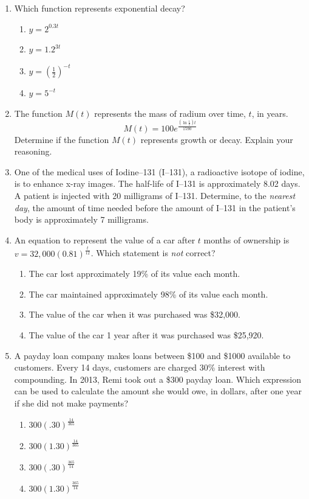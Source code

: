 \documentclass[12pt, oneside]{article}
\begin{document}
\begin{enumerate}
\item Which function represents exponential decay?
\begin{enumerate}
    \item $y=2^{0.3t}$
    \item $y=1.2^{3t}$
    \item $\displaystyle y=\left( \frac{1}{2}\right) ^{-t}$
    \item $y=5^{-t}$
\end{enumerate} %

\item The function $M(t)$ represents the mass of radium over time, $t$, in years.
\[M(t)=100e^{\frac{\left(\ln{\frac{1}{2}}\right)t}{1590}}
\]
Determine if the function $M(t)$ represents growth or decay. Explain your reasoning. %

\item One of the medical uses of Iodine–131 (I–131), a radioactive isotope of iodine, is to enhance x-ray images. The half-life of I–131 is approximately 8.02 days. A patient is injected with 20 milligrams of I–131. Determine, to the \emph{nearest day}, the amount of time needed before the amount of I–131 in the patient’s body is approximately 7 milligrams. %

\item An equation to represent the value of a car after $t$ months of ownership is $\displaystyle v=32,000(0.81)^{\frac{t}{12}}$. Which statement is \emph{not} correct?
\begin{enumerate}
    \item The car lost approximately 19\% of its value each month.
    \item The car maintained approximately 98\% of its value each month.
    \item The value of the car when it was purchased was \$32,000.
    \item The value of the car 1 year after it was purchased was \$25,920.
\end{enumerate} %

\item A payday loan company makes loans between \$100 and \$1000 available to customers. Every 14 days, customers are charged 30\% interest with compounding. In 2013, Remi took out a \$300 payday loan. Which expression can be used to calculate the amount she would owe, in dollars, after one year if she did not make payments?
\begin{enumerate}
    \item $\displaystyle 300(.30)^{ \frac{14}{365}}$
    \item $\displaystyle 300(1.30)^{ \frac{14}{365}}$
    \item $\displaystyle 300(.30)^{ \frac{365}{14}}$
    \item $\displaystyle 300(1.30)^{ \frac{365}{14}}$
\end{enumerate} %


\end{enumerate}
\end{document}
